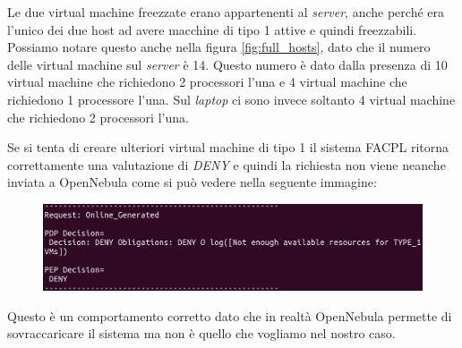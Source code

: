 Le due virtual machine freezzate erano appartenenti al \emph{server}, anche perché era l'unico dei due host ad avere macchine di tipo 1 attive e quindi freezzabili. Possiamo notare questo anche nella figura \ref{fig:full_hosts}, dato che il numero delle virtual machine sul \emph{server} è 14. Questo numero è dato dalla presenza di 10 virtual machine che richiedono 2 processori l'una e 4 virtual machine che richiedono 1 processore l'una. Sul \emph{laptop} ci sono invece soltanto 4 virtual machine che richiedono 2 processori l'una.\par
Se si tenta di creare ulteriori virtual machine di tipo 1 il sistema FACPL ritorna correttamente una valutazione di \emph{DENY} e quindi la richiesta non viene neanche inviata a OpenNebula come si può vedere nella seguente immagine:
\begin{figure}[H]
    \centering
    \includegraphics[width=\textwidth]{tesi_screenshot/notEnoughResources.png}
\end{figure}
Questo è un comportamento corretto dato che in realtà OpenNebula permette di sovraccaricare il sistema ma non è quello che vogliamo nel nostro caso.\par

